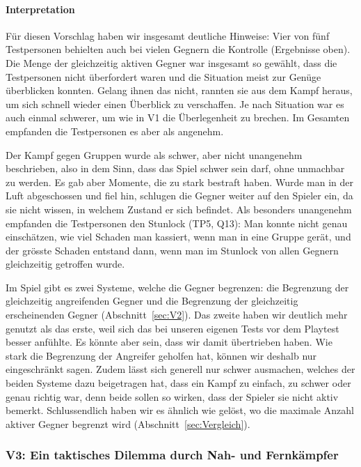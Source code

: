 \documentclass[../Main.tex]{subfiles}
\begin{document}
\paragraph{Interpretation}
Für diesen Vorschlag haben wir insgesamt deutliche Hinweise: Vier von fünf Testpersonen behielten auch bei vielen Gegnern die Kontrolle (Ergebnisse oben). Die Menge der gleichzeitig aktiven Gegner war insgesamt so gewählt, dass die Testpersonen nicht überfordert waren und die Situation meist zur Genüge überblicken konnten. Gelang ihnen das nicht, rannten sie aus dem Kampf heraus, um sich schnell wieder einen Überblick zu verschaffen. Je nach Situation war es auch einmal schwerer, um wie in V1 die Überlegenheit zu brechen. Im Gesamten empfanden die Testpersonen es aber als angenehm.

Der Kampf gegen Gruppen wurde als schwer, aber nicht unangenehm beschrieben, also in dem Sinn, dass das Spiel schwer sein darf, ohne unmachbar zu werden. Es gab aber Momente, die zu stark bestraft haben. Wurde man in der Luft abgeschossen und fiel hin, schlugen die Gegner weiter auf den Spieler ein, da sie nicht wissen, in welchem Zustand er sich befindet. Als besonders unangenehm empfanden die Testpersonen den Stunlock (TP5, Q13): Man konnte nicht genau einschätzen, wie viel Schaden man kassiert, wenn man in eine Gruppe gerät, und der grösste Schaden entstand dann, wenn man im Stunlock von allen Gegnern gleichzeitig getroffen wurde.

Im Spiel gibt es zwei Systeme, welche die Gegner begrenzen: die Begrenzung der gleichzeitig angreifenden Gegner und die Begrenzung der gleichzeitig erscheinenden Gegner (Abschnitt~\ref{sec:V2}). Das zweite haben wir deutlich mehr genutzt als das erste, weil sich das bei unseren eigenen Tests vor dem Playtest besser anfühlte. Es könnte aber sein, dass wir damit übertrieben haben. Wie stark die Begrenzung der Angreifer geholfen hat, können wir deshalb nur eingeschränkt sagen. Zudem lässt sich generell nur schwer ausmachen, welches der beiden Systeme dazu beigetragen hat, dass ein Kampf zu einfach, zu schwer oder genau richtig war, denn beide sollen so wirken, dass der Spieler sie nicht aktiv bemerkt. Schlussendlich haben wir es ähnlich wie  gelöst, wo die maximale Anzahl aktiver Gegner begrenzt wird (Abschnitt~\ref{sec:Vergleich}).

\subsubsection{V3: Ein taktisches Dilemma durch Nah- und Fernkämpfer}
\end{document}
